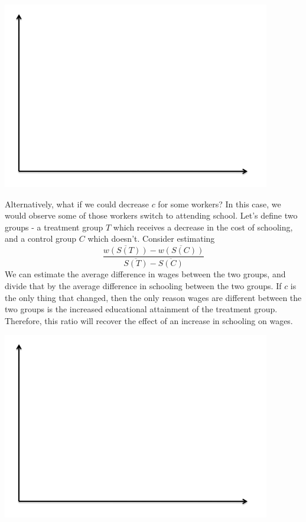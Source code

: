 \documentclass[12pt,english]{article}
\begin{document}
\begin{center}
	\begin{adjustbox}{
			max width=0.65\textwidth,
		}
		\includegraphics{axes.png}
	\end{adjustbox}
\end{center}

Alternatively, what if we could decrease $c$ for some workers? In this case, we would observe some of those workers switch to attending school. Let's define two groups - a treatment group $T$ which receives a decrease in the cost of schooling, and a control group $C$ which doesn't. Consider estimating
$$ \frac{\overline{w(S(T))} - \overline{w(S(C))}}{\overline{S(T)} - \overline{S(C)}} $$
We can estimate the average difference in wages between the two groups, and divide that by the average difference in schooling between the two groups. If $c$ is the only thing that changed, then the only reason wages are different between the two groups is the increased educational attainment of the treatment group. Therefore, this ratio will recover the effect of an increase in schooling on wages.

\begin{center}
	\begin{adjustbox}{
			max width=0.65\textwidth,
		}
		\includegraphics{axes.png}
	\end{adjustbox}
\end{center}
\end{document}
